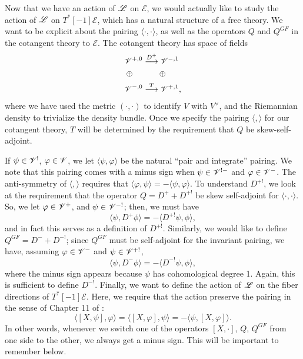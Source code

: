 \documentclass[11pt]{amsart}
\newcommand{\E}{\mscr{E}}
\newcommand{\mscr}{\mathscr}
\numberwithin{equation}{section}
\begin{document}
\begin{remark}
Now that we have an action of $\mathscr L$ on $\E$, we would actually like to study the action of $\mathscr L$ on $T^*[-1]\E$, which has a natural structure of a free theory. We want to be explicit about the pairing $\langle \cdot, \cdot \rangle$, as well as the operators $Q$ and $Q^{GF}$ in the cotangent theory to $\E$. The cotangent theory has space of fields
\begin{align*}
&\mathscr V^{+,0} \overset{D^+}{\longrightarrow} \mathscr V^{-,1}\\
&\oplus \quad\quad\quad \oplus\\
&\mathscr V^{-,0}\overset{T}{\longrightarrow} \mathscr V^{+,1},
\end{align*}
where we have used the metric $(\cdot,\cdot)$ to identify $V$ with $V^\vee$, and the Riemannian density to trivialize the density bundle. Once we specify the pairing $\langle, \rangle$ for our cotangent theory, $T$ will be determined by the requirement that $Q$ be skew-self-adjoint.

If $\psi \in \mathscr V^!$, $\varphi \in \mathscr V$, we let $\langle \psi, \varphi\rangle$ be the natural ``pair and integrate'' pairing. We note that this pairing comes with a minus sign when $\psi \in \mathscr V^{!-}$ and $\varphi \in \mathscr V^-$. The anti-symmetry of $\langle, \rangle$ requires that $\langle \varphi, \psi \rangle = -\langle \psi, \varphi \rangle$. To understand $D^{+!}$, we look at the requirement that the operator $Q = D^++D^{+!}$ be skew self-adjoint for $\langle \cdot, \cdot\rangle$. So, we let $\varphi \in \mathscr V^+$, and $\psi \in \mathscr V^{-!}$; then, we must have 
\[
\langle \psi , D^+ \phi \rangle = - \langle D^{+!}\psi, \phi\rangle,
\]
and in fact this serves as a definition of $D^{+!}$. Similarly, we would like to define $Q^{GF}= D^- +D^{-!}$; since $Q^{GF}$ must be self-adjoint for the invariant pairing, we have, assuming $\varphi \in \mathscr V^-$ and $\psi \in \mathscr V^{+!}$,
\[
\langle \psi , D^- \phi \rangle = - \langle D^{-!}\psi, \phi\rangle,
\]
where the minus sign appears because $\psi$ has cohomological degree 1. Again, this is sufficient to define $D^{-!}$. Finally, we want to define the action of $\mathscr L$ on the fiber directions of $T^*[-1]\E$. Here, we require that the action preserve the pairing in the sense of Chapter 11 of \cite{ref: CG2}:
\[
\langle [X,\psi], \varphi\rangle = \langle [X,\varphi], \psi\rangle = -\langle \psi, [X,\varphi]\rangle.
\]
In other words, whenever we switch one of the operators $[X,\cdot]$, $Q$, $Q^{GF}$ from one side to the other, we always get a minus sign. This will be important to remember below.
\end{remark} 
\end{document}

